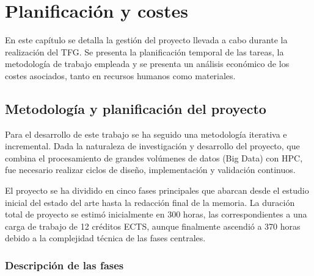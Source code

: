 \chapter{Planificación y costes}
\label{chap:planificacion}

En este capítulo se detalla la gestión del proyecto llevada a cabo durante la realización del TFG.
Se presenta la planificación temporal de las tareas, la metodología de trabajo empleada y se presenta un análisis económico de los costes asociados, tanto en recursos humanos como materiales.

\section{Metodología y planificación del proyecto}\label{sec:planificacion-del-proyecto}

Para el desarrollo de este trabajo se ha seguido una metodología iterativa e incremental.
Dada la naturaleza de investigación y desarrollo del proyecto, que combina el procesamiento de grandes volúmenes de datos (Big Data) con HPC, fue necesario realizar ciclos de diseño, implementación y validación continuos.

El proyecto se ha dividido en cinco fases principales que abarcan desde el estudio inicial del estado del arte hasta la redacción final de la memoria.
La duración total de proyecto se estimó inicialmente en 300 horas, las correspondientes a una carga de trabajo de 12 créditos ECTS, aunque finalmente ascendió a 370 horas debido a la complejidad técnica de las fases centrales.

\subsection{Descripción de las fases}\label{subsec:descripcion-de-las-fases}

